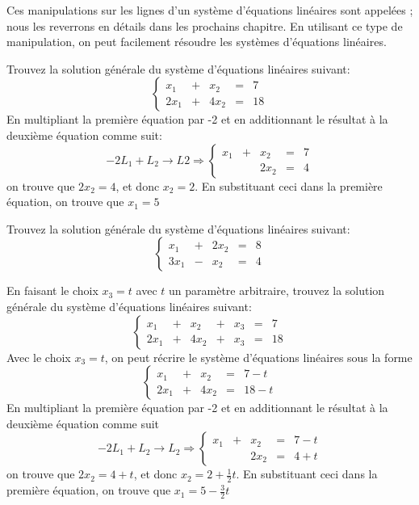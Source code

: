 Ces manipulations sur les lignes d'un système d'équations linéaires sont appelées
; nous les reverrons en détails
dans les prochains chapitre.  En utilisant ce type de manipulation, on peut
facilement résoudre les systèmes d'équations linéaires.
\begin{exemple}
	Trouvez la solution générale du système d'équations linéaires suivant:
	\[
	\left\{\begin{matrix}
	x_1 &+& x_2 &=& 7 \\
	2x_1 &+& 4x_2 &=& 18
	\end{matrix}
	\right.
	\]
	\solution
	En multipliant la première équation par -2 et en additionnant le résultat à
	la deuxième équation comme suit:
	\[
	-2L_1 + L_2 \rightarrow L2 \Rightarrow \left\{\begin{matrix}
	x_1 &+& x_2 &=& 7 \\
	&& 2x_2 &=& 4
	\end{matrix}
	\right.
	\]	
  on trouve que $2x_2 = 4$, et donc $x_2=2$.
	En substituant ceci dans la première équation, on trouve que $x_1=5$
\end{exemple}

\begin{exerciceB}
	Trouvez la solution générale du système d'équations linéaires suivant:
	\[
	\left\{\begin{matrix}
	x_1 &+& 2x_2 &=& 8 \\
	3x_1 &-& x_2 &=& 4
	\end{matrix}
	\right.
	\]
\end{exerciceB}

\begin{exemple}
	En faisant le choix $x_3 = t$ avec $t$ un paramètre arbitraire, trouvez la
	solution générale du système d'équations linéaires suivant:
	\[
	\left\{\begin{matrix}
	x_1 &+& x_2 &+& x_3 &=& 7 \\
	2x_1 &+& 4x_2  &+& x_3 &=& 18
	\end{matrix}
	\right.
	\]
	\solution
	Avec le choix $x_3 = t$, on peut récrire le système d'équations linéaires sous la forme
		\[
	\left\{\begin{matrix}
	x_1 &+& x_2 &=& 7 -t \\
	2x_1 &+& 4x_2 &=& 18-t
	\end{matrix}
	\right.
	\]
	En multipliant la première équation par -2 et en additionnant le résultat à
	la deuxième équation comme suit
			\[
	-2L_1 + L_2 \rightarrow L_2 \Rightarrow \left\{\begin{matrix}
	x_1 &+& x_2 &=& 7 -t \\
	&& 2x_2 &=& 4 + t
	\end{matrix}
	\right.
	\]
	 on trouve que $2x_2 = 4 + t$, et donc $ x_2= 2 + \frac{1}{2}t$.
	En substituant ceci dans la première équation, on trouve que $x_1=5 - \frac{3}{2}t$
\end{exemple}


